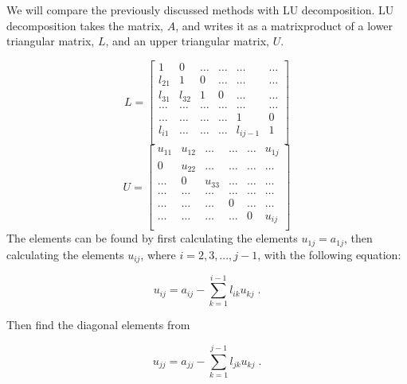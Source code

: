 \documentclass[english,a4paper, 11pt]{article}
\begin{document}
We will compare the previously discussed methods with LU decomposition. LU decomposition takes the matrix, $A$, and writes it as a matrixproduct of a lower triangular matrix, $L$, and an upper triangular matrix, $U$. 

$$
    L = \begin{bmatrix}
                           1& 0 & \dots  &\dots   & \dots &\dots \\
                           l_{21} & 1 & 0 &\dots &\dots &\dots \\
                           l_{31}& l_{32}& 1 & 0 & \dots & \dots \\
                           \dots& \dots   & \dots &\dots   &\dots & \dots \\
                           \dots&  \dots &\dots  &\dots &1& 0 \\
                           l_{i1}& \dots   & \dots & \dots  &l_{ij-1}& 1\\
                      \end{bmatrix}
                      $$
                      $$
    	U = \begin{bmatrix}
                           u_{11}& u_{12} & \dots &\dots   & \dots &u_{1j} \\
                           0 & u_{22} & \dots &\dots &\dots &\dots \\
                          \dots & 0& u_{33} & \dots & \dots & \dots \\
                         \dots  & \dots   & \dots &\dots   &\dots & \dots \\
                          \dots &\dots   & \dots &0  &\dots& \dots \\
                           \dots&  \dots  &\dots  &  \dots &0& u_{ij}\\
                      \end{bmatrix}$$
 \newline
The elements can be found by first calculating the elements $u_{1j} = a_{1j}$, then calculating the elements $u_{ij}$, where $i = 2, 3, ..., j-1$, with the following equation:

\begin{equation}
u_{ij} = a_{ij} - \sum_{k=1}^{i-1} l_{ik}u_{kj}\;.
\label{LUu}
\end{equation}

Then find the diagonal elements from

\begin{equation}
u_{jj} = a_{jj} - \sum_{k=1}^{j-1} l_{jk}u_{kj}\;.
\label{LUdiagonal}
\end{equation}
\end{document}
